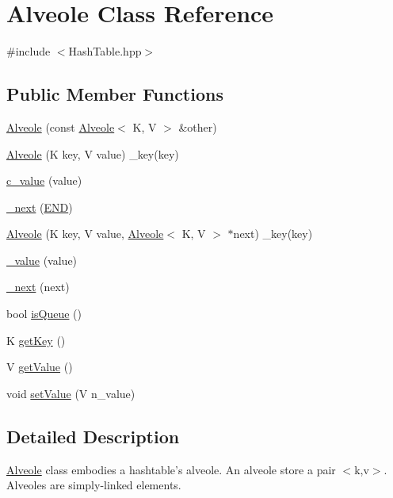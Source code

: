 \hypertarget{class_alveole}{\section{Alveole Class Reference}
\label{class_alveole}
}


{\ttfamily \#include $<$Hash\-Table.\-hpp$>$}

\subsection*{Public Member Functions}
\begin{DoxyCompactItemize}
\item 
\hyperlink{class_alveole_a3ebfa3f42acae6ad928e8168114b3965}{Alveole} (const \hyperlink{class_alveole}{Alveole}$<$ K, V $>$ \&other)
\item 
\hyperlink{class_alveole_a9e4aecc9d0671a5887bb11ed3aadfb8c}{Alveole} (K key, V value) \-\_\-key(key)
\item 
\hyperlink{class_alveole_ad28d7b0a0de255e2fcdaa0826dafa376}{c\-\_\-value} (value)
\item 
\hyperlink{class_alveole_a6e9f9d96861447f8406314dad1746176}{\-\_\-next} (\hyperlink{_hash_table_8hpp_a29fd18bed01c4d836c7ebfe73a125c3f}{E\-N\-D})
\item 
\hyperlink{class_alveole_acb54d4f5ede392e30c60c4e85e55239a}{Alveole} (K key, V value, \hyperlink{class_alveole}{Alveole}$<$ K, V $>$ $\ast$next) \-\_\-key(key)
\item 
\hyperlink{class_alveole_a2e5ad3e79a9cabaee646590a7568c519}{\-\_\-value} (value)
\item 
\hyperlink{class_alveole_afb926f1df7eb182975a5a5b52ded736d}{\-\_\-next} (next)
\item 
bool \hyperlink{class_alveole_a50d6115afd8f29ed898e210b51e901e5}{is\-Queue} ()
\item 
K \hyperlink{class_alveole_a851fe0cac8f81cae711385f10973cf5d}{get\-Key} ()
\item 
V \hyperlink{class_alveole_a0c56d83c6f8152a7674cddf1faf56bc5}{get\-Value} ()
\item 
void \hyperlink{class_alveole_afd3607532906bead78ba7c52f956e0b0}{set\-Value} (V n\-\_\-value)
\end{DoxyCompactItemize}


\subsection{Detailed Description}
\hyperlink{class_alveole}{Alveole} class embodies a hashtable's alveole. An alveole store a pair $<$k,v$>$. Alveoles are simply-\/linked elements. 

